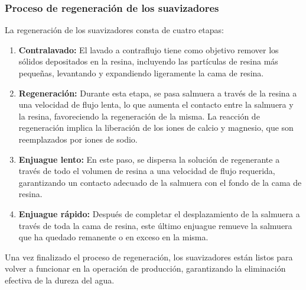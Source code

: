 \subsubsection{Proceso de regeneración de los suavizadores}

La regeneración de los suavizadores consta de cuatro etapas:

\begin{enumerate}

    \item \textbf{ Contralavado:} El lavado a contraflujo tiene como objetivo remover los sólidos depositados en la resina, incluyendo las partículas de resina más pequeñas, levantando y expandiendo ligeramente la cama de resina.

    \item \textbf{ Regeneración:} Durante esta etapa, se pasa salmuera a través de la resina a una velocidad de flujo lenta, lo que aumenta el contacto entre la salmuera y la resina, favoreciendo la regeneración de la misma. La reacción de regeneración implica la liberación de los iones de calcio y magnesio, que son reemplazados por iones de sodio.

    \item \textbf{ Enjuague lento:} En este paso, se dispersa la solución de regenerante a través de todo el volumen de resina a una velocidad de flujo requerida, garantizando un contacto adecuado de la salmuera con el fondo de la cama de resina.

    \item \textbf{ Enjuague rápido:} Después de completar el desplazamiento de la salmuera a través de toda la cama de resina, este último enjuague remueve la salmuera que ha quedado remanente o en exceso en la misma.

    
\end{enumerate}

Una vez finalizado el proceso de regeneración, los suavizadores están listos para volver a funcionar en la operación de producción, garantizando la eliminación efectiva de la dureza del agua.






